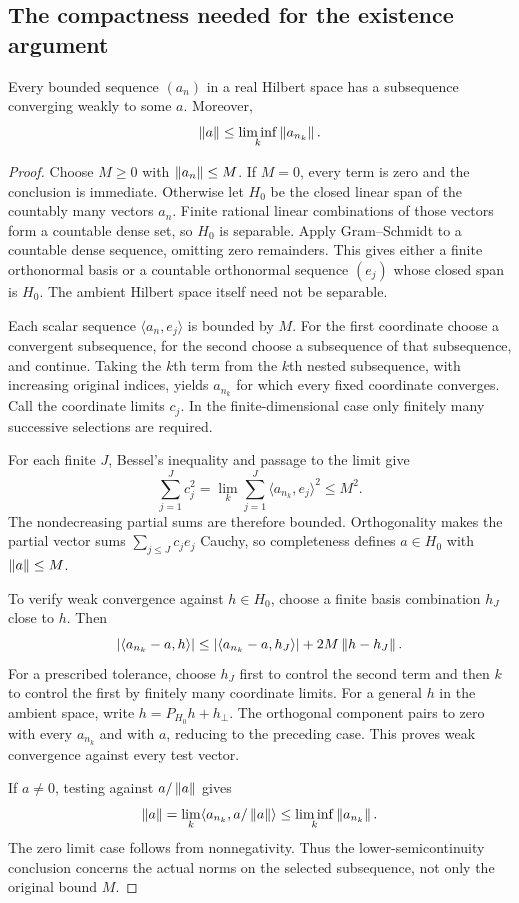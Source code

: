 \subsection{The compactness needed for the existence argument}
\begin{KSlemma}\label{KS:lem:weak-subsequence}
Every bounded sequence $(a_n)$ in a real Hilbert space has a subsequence converging weakly to some $a$. Moreover,
\[
 \left\lVert a\right\rVert\le\liminf_k\left\lVert a_{n_k}\right\rVert.
\]
\end{KSlemma}
\begin{proof}
Choose $M\ge0$ with $\left\lVert a_n\right\rVert\le M$. If $M=0$, every term is zero and the conclusion is immediate. Otherwise let $H_0$ be the closed linear span of the countably many vectors $a_n$. Finite rational linear combinations of those vectors form a countable dense set, so $H_0$ is separable. Apply Gram--Schmidt to a countable dense sequence, omitting zero remainders. This gives either a finite orthonormal basis or a countable orthonormal sequence $(e_j)$ whose closed span is $H_0$. The ambient Hilbert space itself need not be separable.

Each scalar sequence $\langle a_n,e_j\rangle$ is bounded by $M$. For the first coordinate choose a convergent subsequence, for the second choose a subsequence of that subsequence, and continue. Taking the $k$th term from the $k$th nested subsequence, with increasing original indices, yields $a_{n_k}$ for which every fixed coordinate converges. Call the coordinate limits $c_j$. In the finite-dimensional case only finitely many successive selections are required.

For each finite $J$, Bessel's inequality and passage to the limit give
\[
 \sum_{j=1}^Jc_j^2
 =\lim_k\sum_{j=1}^J\langle a_{n_k},e_j\rangle^2\le M^2.
\]
The nondecreasing partial sums are therefore bounded. Orthogonality makes the partial vector sums $\sum_{j\le J}c_je_j$ Cauchy, so completeness defines $a\in H_0$ with $\left\lVert a\right\rVert\le M$.

To verify weak convergence against $h\in H_0$, choose a finite basis combination $h_J$ close to $h$. Then
\[
 |\langle a_{n_k}-a,h\rangle|
 \le |\langle a_{n_k}-a,h_J\rangle|
      +2M\left\lVert h-h_J\right\rVert.
\]
For a prescribed tolerance, choose $h_J$ first to control the second term and then $k$ to control the first by finitely many coordinate limits. For a general $h$ in the ambient space, write $h=P_{H_0}h+h_\perp$. The orthogonal component pairs to zero with every $a_{n_k}$ and with $a$, reducing to the preceding case. This proves weak convergence against every test vector.

If $a\ne0$, testing against $a/\left\lVert a\right\rVert$ gives
\[
 \left\lVert a\right\rVert=\lim_k\langle a_{n_k},a/\left\lVert a\right\rVert\rangle
 \le\liminf_k\left\lVert a_{n_k}\right\rVert.
\]
The zero limit case follows from nonnegativity. Thus the lower-semicontinuity conclusion concerns the actual norms on the selected subsequence, not only the original bound $M$.
\end{proof}


